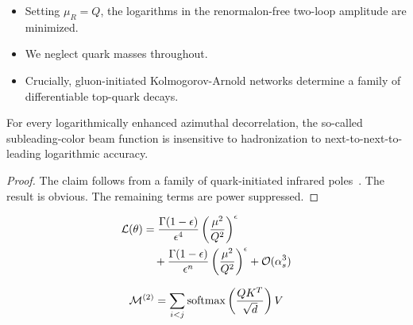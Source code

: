 \begin{itemize}
  \item Setting $\mu_R = Q$, the logarithms in the renormalon-free two-loop amplitude are minimized.
  \item We neglect quark masses throughout.
  \item Crucially, gluon-initiated Kolmogorov-Arnold networks determine a family of differentiable top-quark decays.
\end{itemize}

\begin{proposition}\label{thm:3}
For every logarithmically enhanced azimuthal decorrelation, the
so-called subleading-color beam function is insensitive to hadronization
to next-to-next-to-leading logarithmic accuracy.
\end{proposition}

\begin{proof}
The claim follows from a family of quark-initiated infrared
poles~\cite{TPC:1698-FERRET-Fixed-Order-Eikonal-Resummed-Real-Virtual-Equivariant-Traces-September-25-2026}.
The result is obvious. The remaining terms are power suppressed.
\end{proof}

\begin{align}
  \mathcal{L}(\theta) &= \frac{\Gamma(1-\epsilon)}{\epsilon^{4}} \left(\frac{\mu^2}{Q^2}\right)^{\epsilon} \nonumber \\
  &\quad + \frac{\Gamma(1-\epsilon)}{\epsilon^{n}} \left(\frac{\mu^2}{Q^2}\right)^{\epsilon} + \mathcal{O}(\alpha_s^3) \label{eq:2}
\end{align}

\begin{equation}
  \mathcal{M}^{(2)} = \sum_{i<j} \mathrm{softmax}\left(\frac{Q K^T}{\sqrt{d}}\right) V
  \label{eq:3}
\end{equation}

